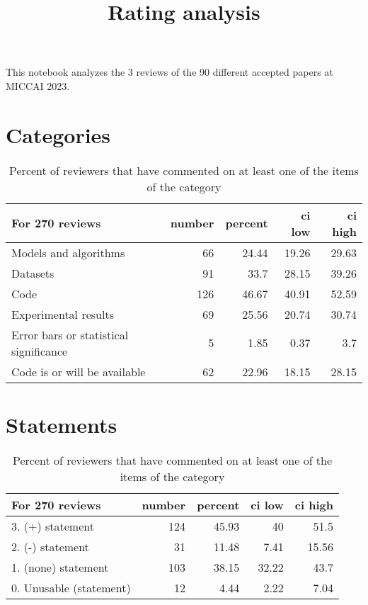 \documentclass{article}
\title{Rating analysis}
\begin{document}
\maketitle

This notebook analyzes the 3 reviews of the 90 different accepted papers at MICCAI 2023.

\section{Categories} 

\begin{table}[H]

\centering

\begin{tabular}{lrrrr}
\hline
 For 270 reviews                        &   number &   percent &   ci low &   ci high \\
\hline
 Models and algorithms                  &       66 &     24.44 &    19.26 &     29.63 \\
 Datasets                               &       91 &     33.7  &    28.15 &     39.26 \\
 Code                                   &      126 &     46.67 &    40.91 &     52.59 \\
 Experimental results                   &       69 &     25.56 &    20.74 &     30.74 \\
 Error bars or statistical significance &        5 &      1.85 &     0.37 &      3.7  \\
 Code is or will be available           &       62 &     22.96 &    18.15 &     28.15 \\
\hline
\end{tabular}\caption{Percent of reviewers that have commented on at least one of the items of the category}

\end{table}



\section{Statements} 

\begin{table}[H]

\centering

\begin{tabular}{lrrrr}
\hline
 For 270 reviews         &   number &   percent &   ci low &   ci high \\
\hline
 3. (+) statement        &      124 &     45.93 &    40    &     51.5  \\
 2. (-) statement        &       31 &     11.48 &     7.41 &     15.56 \\
 1. (none) statement     &      103 &     38.15 &    32.22 &     43.7  \\
 0. Unusable (statement) &       12 &      4.44 &     2.22 &      7.04 \\
\hline
\end{tabular}\caption{Percent of reviewers that have commented on at least one of the items of the category}

\end{table}
\end{document}
